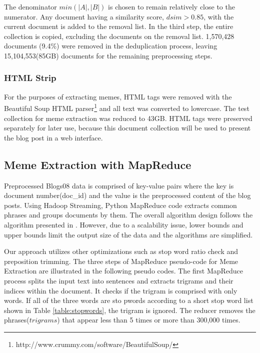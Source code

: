 \documentclass{sig-alternate}
\begin{document}
The denominator $min(|A|, |B|)$ is chosen to remain relatively close to the numerator. Any document having a similarity score, $dsim > 0.85$, with the current document is added to the removal list. In the third step, the entire collection is copied, excluding the documents on the removal list. 1,570,428 documents (9.4\%) were removed in the deduplication process, leaving 15,104,553(85GB) documents for the remaining preprocessing steps.

\subsubsection{HTML Strip}

For the purposes of extracting memes, HTML tags were removed with the Beautiful Soup HTML parser\footnote{http://www.crummy.com/software/BeautifulSoup/} and all text was converted to lowercase. The test collection for meme extraction was reduced to 43GB. HTML tags were preserved separately for later use, because this document collection will be used to present the blog post in a web interface.

\subsection{Meme Extraction with MapReduce}

Preprocessed Blogs08 data is comprised of key-value pairs where the key is document number(doc\_id) and the value is the preprocessed content of the blog posts. Using Hadoop Streaming, Python MapReduce code extracts common phrases and groups documents by them. The overall algorithm design follows the algorithm presented in \cite{Kolak2008}. However, due to a scalability issue, lower bounds and upper bounds limit the output size of the data and the algorithms are simplified.

Our approach utilizes other optimizations such as stop word ratio check and preposition trimming. The three steps of MapReduce pseudo-code for Meme Extraction are illustrated in the following pseudo codes. The first MapReduce process splits the input text into sentences and extracts trigrams and their indices within the document. It checks if the trigram is comprised with only words. If all of the three words are sto pwords according to a short stop word list shown in Table \ref{table:stopwords}, the trigram is ignored. The reducer removes the phrases($trigrams$) that appear less than 5 times or more than 300,000 times.
\end{document}
